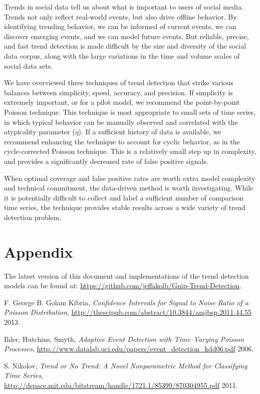 \documentclass{article}
\begin{document}
Trends in social data tell us about what is important to users of social media.
Trends not only reflect real-world events, but also drive offline behavior. By
identifying trending behavior, we can be informed of current events, we can
discover emerging events, and we can model future events. But reliable,
precise, and fast trend detection is made difficult by the size and diversity
of the social data corpus, along with the large variations in the time and
volume scales of social data sets. 

We have overviewed three techniques of trend detection that strike various
balances between simplicity, speed, accuracy, and precision.
If simplicity is extremely important, or for a pilot model, we
recommend the point-by-point Poisson technique. This technique is most
appropriate to small sets of time series, in which typical behavior can be
manually observed and correlated with the atypicality parameter ($\eta$). If a 
sufficient history of data is available, we recommend enhancing the technique
to account for cyclic behavior, as in the cycle-corrected Poisson technique.
This is a relatively small step up in complexity, and provides a significantly
decreased rate of false positive signals. 

When optimal coverage and false positive rates are worth extra model complexity
and technical commitment, the data-driven method is worth investigating. While it
is potentially difficult to collect and label a sufficient number of comparison
time series, the technique provides stable results across a wide variety of
trend detection problem. 


\appendix
\section{Appendix}
The latest version of this document 
and implementations of the trend detection models 
can be found at:
\noindent \url{https://github.com/jeffakolb/Gnip-Trend-Detection}.

%



\begin{thebibliography}{2013}

 F. George B. Golam Kibria, \textsl{Confidence
    Intervals for Signal to Noise Ratio of a Poisson Distribution},
    \url{http://thescipub.com/abstract/10.3844/amjbsp.2011.44.55} 2013.

 Ihler, Hutchins, Smyth, \textsl{Adaptive Event
    Detection with Time–Varying Poisson Processes},
    \url{http://www.datalab.uci.edu/papers/event_detection_kdd06.pdf} 2006.

 S. Nikolov, \textsl{Trend or No Trend: A Novel
    Nonparametric Method for Classifying Time Series},
    \url{http://dspace.mit.edu/bitstream/handle/1721.1/85399/870304955.pdf}
    2011.  

\end{thebibliography}
\end{document}
